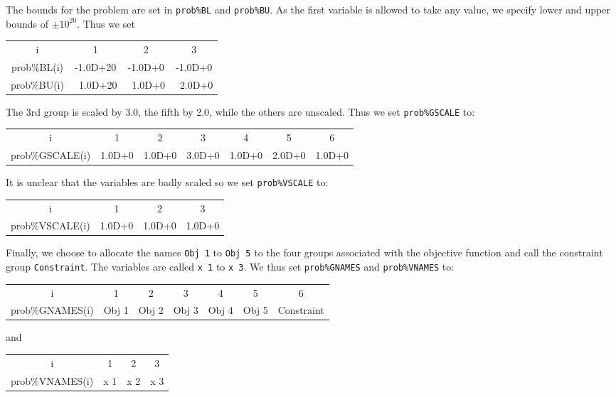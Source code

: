 \documentclass{galahad}
\begin{document}
The bounds
for the problem are set in {\tt prob\%BL} and {\tt prob\%BU}. As the first
variable is allowed to take any value, we specify lower and
upper bounds of $\pm 10^{20}$. Thus we set

\begin{center}
{\tt \begin{tabular}{cccc}
i         & 1 & 2 & 3 \\
prob\%BL(i)     & -1.0D+20 & -1.0D+0  & -1.0D+0 \\
prob\%BU(i)     & ~1.0D+20 & ~1.0D+0  & ~2.0D+0
\end{tabular} }
\end{center}

The 3rd group is scaled by 3.0, the fifth by 2.0,  while the others
are  unscaled. Thus we set {\tt prob\%GSCALE} to:

\begin{center}
{\tt \begin{tabular}{ccccccc}
i         & 1 & 2 & 3 & 4 & 5 & 6 \\
prob\%GSCALE(i) & 1.0D+0 & 1.0D+0  & 3.0D+0 & 1.0D+0 & 2.0D+0 & 1.0D+0
\end{tabular} }
\end{center}
It is unclear that the variables are badly scaled so we
set {\tt prob\%VSCALE} to:

\begin{center}
{\tt \begin{tabular}{cccc}
i         & 1 & 2 & 3 \\
prob\%VSCALE(i) & 1.0D+0 & 1.0D+0 & 1.0D+0
\end{tabular} }
\end{center}

Finally, we choose to allocate the names {\tt Obj 1} to {\tt Obj 5} to
the four groups
associated with the objective function
and call the constraint
group {\tt Constraint}. The variables are called {\tt x 1}
to {\tt x 3}. We thus set {\tt prob\%GNAMES} and {\tt prob\%VNAMES} to:

\begin{center}
{\tt \begin{tabular}{ccccccc}
i         & 1 & 2 & 3 & 4 & 5 & 6 \\
prob\%GNAMES(i) & Obj 1 & Obj 2  & Obj 3 & Obj 4 & Obj 5 & Constraint
\end{tabular} }
\end{center}
and

\begin{center}
{\tt \begin{tabular}{cccc}
i         & 1 & 2 & 3 \\
prob\%VNAMES(i) & x 1 & x 2 & x 3
\end{tabular} }
\end{center}
\end{document}
